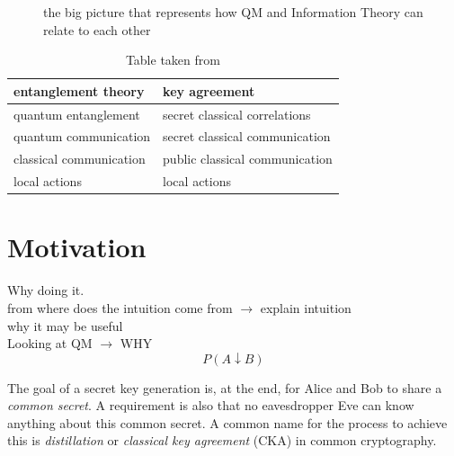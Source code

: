 

	\begin{figure}[H]
		\centering
		
		\caption{the big picture that represents how QM and Information Theory can relate to each other}
	\end{figure}
	\begin{table}[ht]
	 \centering
	 	\begin{tabular}{ l | l}
	 		\textbf{entanglement theory} & \textbf{key agreement} \\ 
	 		\hline 
	 		quantum entanglement & secret classical correlations \\ 
	 		quantum communication & secret classical communication \\ 
	 		classical communication & public classical communication \\ 
	 		local actions & local actions \\ 
	 	\end{tabular} 
	 	\caption{Table taken from \cite{4H07}}
	 \end{table}
	
	
	\section{Motivation}
	Why doing it. \\
	from where does the intuition come from $\rightarrow$ explain intuition\\
	why it may be useful\\
	Looking at QM $\rightarrow$ WHY\\
	
	$$ P(A\downarrow B)$$
	
	The goal of a secret key generation is, at the end, for Alice and Bob to share a \emph{common secret}.  A requirement is also that no eavesdropper Eve can know anything about this common secret. A common name for the process to achieve this is \emph{distillation} or \emph{classical key agreement} (CKA) in common cryptography.
	
